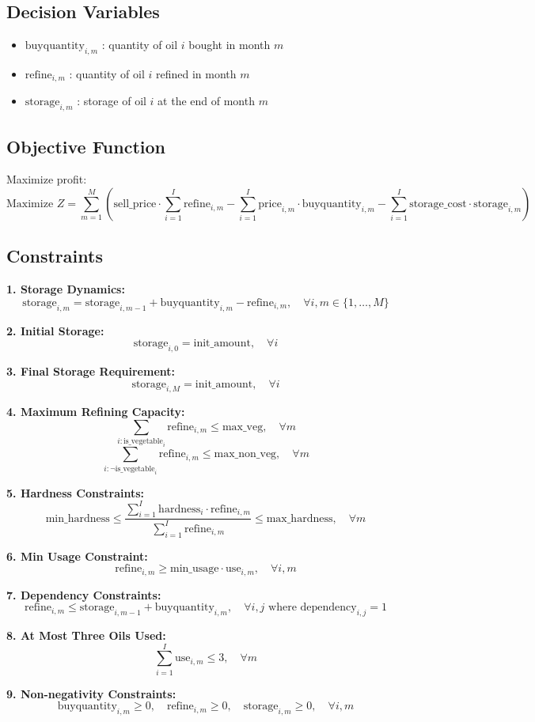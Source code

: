 \documentclass{article}
\begin{document}
\subsection*{Decision Variables}
\begin{itemize}
    \item \( \text{buyquantity}_{i,m} \) : quantity of oil \( i \) bought in month \( m \)
    \item \( \text{refine}_{i,m} \) : quantity of oil \( i \) refined in month \( m \)
    \item \( \text{storage}_{i,m} \) : storage of oil \( i \) at the end of month \( m \)
\end{itemize}

\subsection*{Objective Function}
Maximize profit:
\[
\text{Maximize } Z = \sum_{m=1}^{M} \left( \text{sell\_price} \cdot \sum_{i=1}^{I} \text{refine}_{i,m} - \sum_{i=1}^{I} \text{price}_{i,m} \cdot \text{buyquantity}_{i,m} - \sum_{i=1}^{I} \text{storage\_cost} \cdot \text{storage}_{i,m} \right)
\]

\subsection*{Constraints}

\textbf{1. Storage Dynamics:}
\[
\text{storage}_{i,m} = \text{storage}_{i,m-1} + \text{buyquantity}_{i,m} - \text{refine}_{i,m}, \quad \forall i, m \in \{1, \ldots, M\}
\]

\textbf{2. Initial Storage:}
\[
\text{storage}_{i,0} = \text{init\_amount}, \quad \forall i
\]

\textbf{3. Final Storage Requirement:}
\[
\text{storage}_{i,M} = \text{init\_amount}, \quad \forall i
\]

\textbf{4. Maximum Refining Capacity:}
\[
\sum_{i: \text{is\_vegetable}_{i}} \text{refine}_{i,m} \leq \text{max\_veg}, \quad \forall m
\]
\[
\sum_{i: \neg \text{is\_vegetable}_{i}} \text{refine}_{i,m} \leq \text{max\_non\_veg}, \quad \forall m
\]

\textbf{5. Hardness Constraints:}
\[
\text{min\_hardness} \leq \frac{\sum_{i=1}^{I} \text{hardness}_{i} \cdot \text{refine}_{i,m}}{\sum_{i=1}^{I} \text{refine}_{i,m}} \leq \text{max\_hardness}, \quad \forall m
\]

\textbf{6. Min Usage Constraint:}
\[
\text{refine}_{i,m} \geq \text{min\_usage} \cdot \text{use}_{i,m}, \quad \forall i, m
\]

\textbf{7. Dependency Constraints:}
\[
\text{refine}_{i,m} \leq \text{storage}_{i,m-1} + \text{buyquantity}_{i,m}, \quad \forall i, j \text{ where } \text{dependency}_{i,j}=1
\]

\textbf{8. At Most Three Oils Used:}
\[
\sum_{i=1}^{I} \text{use}_{i,m} \leq 3, \quad \forall m
\]

\textbf{9. Non-negativity Constraints:}
\[
\text{buyquantity}_{i,m} \geq 0, \quad \text{refine}_{i,m} \geq 0, \quad \text{storage}_{i,m} \geq 0, \quad \forall i, m
\]
\end{document}
